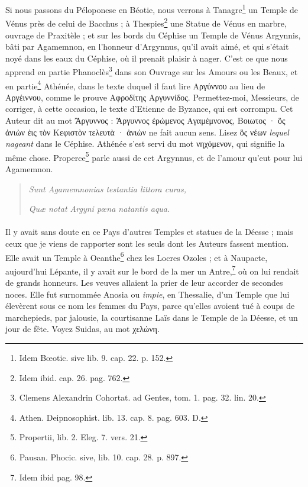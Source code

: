 \documentclass[a4paper, 11pt, oneside, polutonikogreek, french]{article}
\begin{document}
Si nous passons du Péloponese en Béotie, nous verrons à Tanagre\footnote{Idem Bœotic. sive lib. 9. cap. 22. p. 152.} un Temple de Vénus près de celui de Bacchus ; à Thespies\footnote{Idem ibid. cap. 26. pag. 762.} une Statue de Vénus en marbre, ouvrage de Praxitèle ; et sur les bords du Céphise un Temple de Vénus Argynnis, bâti par Agamemnon, en l'honneur d'Argynnus, qu'il avait aimé, et qui s'était noyé dans les eaux du Céphise, où il prenait plaisir à nager. C'est ce que nous apprend en partie Phanoclès\footnote{Clemens Alexandrin Cohortat. ad Gentes, tom. 1. pag. 32. lin. 20.} dans son Ouvrage sur les Amours ou les Beaux, et en partie\footnote{Athen. Deipnosophist. lib. 13. cap. 8. pag. 603. D.} Athénée, dans le texte duquel il faut lire Αργύννου au lieu de Αργέιννου, comme le prouve Αφροδίτης Αργυννίδος. Permettez-moi, Messieurs, de corriger, à cette occasion, le texte d'Etienne de Byzance, qui est corrompu. Cet Auteur dit au mot Ἄργυννος : Ἄργυννος ἐρώμενος Αγαμέμνονος, Βοιωτος · ὃς ἀνιὼν ἐις τὸν Κεφιστὸν τελευτὰ · ἀνιὼν ne fait aucun sens. Lisez ὃς νέων \emph{lequel nageant} dans le Céphise. Athénée s'est servi du mot νηχόμενον, qui signifie la même chose. Properce\footnote{Propertii, lib. 2. Eleg. 7. vers. 21.} parle aussi de cet Argynnus, et de l'amour qu'eut pour lui Agamemnon.
\begin{quotation}
\emph{Sunt Agamemnonias testantia littora curas,}

\hspace*{5mm}\emph{Quæ notat Argyni pœna natantis aqua.}
\end{quotation}
\paragraph{}
Il y avait sans doute en ce Pays d'autres Temples et statues de la Déesse ; mais ceux que je viens de rapporter sont les seuls dont les Auteurs fassent mention. Elle avait un Temple à Oeanthe\footnote{Pausan. Phocic. sive, lib. 10. cap. 28. p. 897.} chez les Locres Ozoles ; et à Naupacte, aujourd'hui Lépante, il y avait sur le bord de la mer un Antre,\footnote{Idem ibid pag. 98.} où on lui rendait de grands honneurs. Les veuves allaient la prier de leur accorder de secondes noces. Elle fut surnommée Anosia ou \emph{impie}, en Thessalie, d'un Temple que lui élevèrent sous ce nom les femmes du Pays, parce qu'elles avoient tué à coups de marchepieds, par jalousie, la courtisanne Laïs dans le Temple de la Déesse, et un jour de fête. Voyez Suidas, au mot χελώνη.
\end{document}
